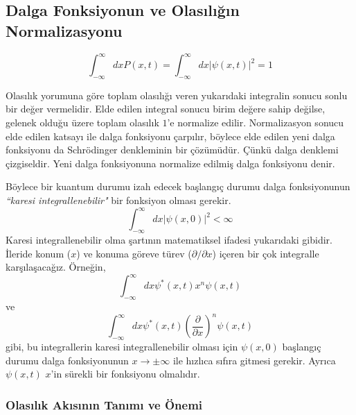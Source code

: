 \documentclass[a4paper,12pt, twoside]{article}
\begin{document}
\subsection{Dalga Fonksiyonun ve Olasılığın Normalizasyonu}

\begin{equation}
\int ^{\infty }_{-\infty }dxP\left( x,t\right) =\int ^{\infty }_{-\infty }dx\left| \psi \left( x,t\right) \right| ^{2}=1
\label{eq:probability_norm}
\end{equation}

Olasılık yorumuna göre toplam olasılığı veren yukarıdaki integralin  sonucu sonlu bir değer vermelidir.  Elde edilen integral sonucu birim değere sahip değilse, gelenek olduğu üzere toplam olasılık $1$'e normalize edilir.  Normalizasyon sonucu  elde edilen katsayı ile dalga fonksiyonu çarpılır, böylece elde edilen yeni dalga fonksiyonu da Schrödinger denkleminin bir çözümüdür. Çünkü dalga denklemi çizgiseldir. Yeni dalga fonksiyonuna normalize edilmiş dalga fonksiyonu denir.

Böylece bir kuantum durumu izah edecek başlangıç durumu dalga fonksiyonunun \emph{``karesi integrallenebilir"} bir fonksiyon olması gerekir. 
\begin{equation}
\int ^{\infty }_{-\infty }dx\left| \psi \left( x,0\right) \right| ^{2} < \infty
\label{eq:square_integrable}
\end{equation}
Karesi integrallenebilir olma şartının matematiksel ifadesi yukarıdaki gibidir. İleride konum ($x$) ve konuma göreve türev ($\partial/\partial x$) içeren bir çok integralle karşılaşacağız. Örneğin,
\begin{equation*}
\int ^{\infty }_{-\infty }dx \psi^* \left( x,t\right) x^n \psi \left( x,t\right) 
\end{equation*}
ve
\begin{equation*}
\int ^{\infty }_{-\infty }dx \psi^* \left( x,t\right) \left(\frac{\partial}{\partial x}\right)^n \psi \left( x,t\right) 
\end{equation*}
gibi, bu integrallerin karesi integrallenebilir olması için $\psi(x,0)$ başlangıç durumu dalga fonksiyonunun $x\rightarrow\pm\infty$ ile hızlıca sıfıra gitmesi gerekir. Ayrıca $\psi(x,t)$ $x$'in sürekli bir fonksiyonu olmalıdır.

\subsubsection{Olasılık Akısının Tanımı ve Önemi}
\end{document}
